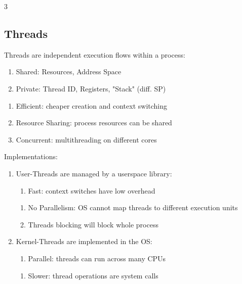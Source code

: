 \documentclass[12pt, a4paper]{article}
\begin{document}
\begin{multicols*}{3}
\subsection{Threads}
Threads are independent execution flows within a process:
\begin{enumerate}[\roman*.]
  \item Shared: Resources, Address Space 
  \item Private: Thread ID, Registers, "Stack" (diff. SP)
\end{enumerate}\vspace{-1pt}
\begin{enumerate}[$+$]
  \item Efficient: cheaper creation and context switching
  \item Resource Sharing: process resources can be shared
  \item Concurrent: multithreading on different cores
\end{enumerate}\vspace{-1pt}
{\centering
\par}
Implementations:
\begin{enumerate}[\roman*.]
  \item User-Threads are managed by a userspace library:
    \begin{enumerate}[$+$]\vspace{2pt}
    \item Fast: context switches have low overhead
  \end{enumerate}
  \begin{enumerate}[$-$]\vspace{6pt}
    \item No Parallelism: OS cannot map threads to different execution units 
    \item Threads blocking will block whole process
  \end{enumerate}
\item Kernel-Threads are implemented in the OS:
  \begin{enumerate}[$+$]\vspace{2pt}
    \item Parallel: threads can run across many CPUs 
  \end{enumerate}
  \begin{enumerate}[$-$]\vspace{6pt}
    \item Slower: thread operations are system calls
  \end{enumerate}
\end{enumerate}


\end{multicols*}
\end{document}
